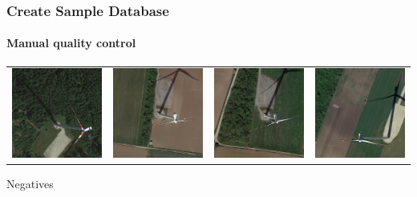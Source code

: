 \documentclass[color=usenames,dvipsnames]{beamer}
\begin{document}
\begin{frame}
\frametitle{Create Sample Database}
\framesubtitle{Manual quality control}


\begin{table}[ht]
\centering
\begin{tabular}{cccc}
\includegraphics[width=0.2\linewidth]{../figures/wt_at_1.png}&
\includegraphics[width=0.2\linewidth]{../figures/wt_at_2.png}&
\includegraphics[width=0.2\linewidth]{../figures/wt_at_3.png}&
\includegraphics[width=0.2\linewidth]{../figures/wt_at_4.png}\\
\end{tabular}
\end{table}

\begin{center}
Negatives
\end{center}


\end{frame}
\end{document}

